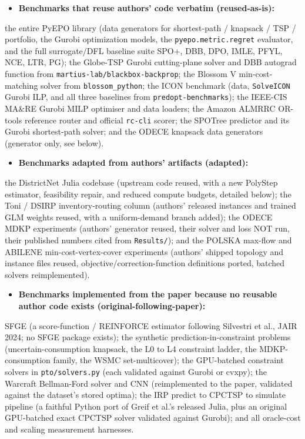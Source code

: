 \documentclass[10pt]{article}
\begin{document}
\begin{itemize}\setlength{\itemsep}{2pt}
\item \textbf{Benchmarks that reuse authors' code verbatim (reused-as-is):}
\end{itemize}
  the entire PyEPO library (data generators for shortest-path / knapsack / TSP / portfolio, the Gurobi optimization
  models, the \texttt{pyepo.metric.regret} evaluator, and the full surrogate/DFL baseline suite SPO+, DBB, DPO, IMLE, PFYL,
  NCE, LTR, PG); the Globe-TSP Gurobi cutting-plane solver and DBB autograd function from \texttt{martius-lab/blackbox-backprop};
  the Blossom V min-cost-matching solver from \texttt{blossom\_python}; the ICON benchmark (data, \texttt{SolveICON} Gurobi ILP, and
  all three baselines from \texttt{predopt-benchmarks}); the IEEE-CIS MA\&RE Gurobi MILP optimiser and data loaders; the Amazon
  ALMRRC OR-tools reference router and official \texttt{rc-cli} scorer; the SPOTree predictor and its Gurobi shortest-path
  solver; and the ODECE knapsack data generators (generator only, see below).

\begin{itemize}\setlength{\itemsep}{2pt}
\item \textbf{Benchmarks adapted from authors' artifacts (adapted):}
\end{itemize}
  the DistrictNet Julia codebase (upstream code reused, with a new PolyStep estimator, feasibility repair, and reduced
  compute budgets, detailed below); the Toni / DSIRP inventory-routing column (authors' released instances and trained
  GLM weights reused, with a uniform-demand branch added); the ODECE MDKP experiments (authors' generator reused, their
  solver and loss NOT run, their published numbers cited from \texttt{Results/}); and the POLSKA max-flow and ABILENE
  min-cost-vertex-cover experiments (authors' shipped topology and instance files reused, objective/correction-function
  definitions ported, batched solvers reimplemented).

\begin{itemize}\setlength{\itemsep}{2pt}
\item \textbf{Benchmarks implemented from the paper because no reusable author code exists (original-following-paper):}
\end{itemize}
  SFGE (a score-function / REINFORCE estimator following Silvestri et al., JAIR 2024; no SFGE package exists); the
  synthetic prediction-in-constraint problems (uncertain-consumption knapsack, the L0 to L4 constraint ladder, the
  MDKP-consumption family, the WSMC set-multicover); the GPU-batched constraint solvers in \texttt{pto/solvers.py} (each
  validated against Gurobi or cvxpy); the Warcraft Bellman-Ford solver and CNN (reimplemented to the paper, validated
  against the dataset's stored optima); the IRP predict to CPCTSP to simulate pipeline (a faithful Python port of
  Greif et al.'s released Julia, plus an original GPU-batched exact CPCTSP solver validated against Gurobi); and all
  oracle-cost and scaling measurement harnesses.
\end{document}
